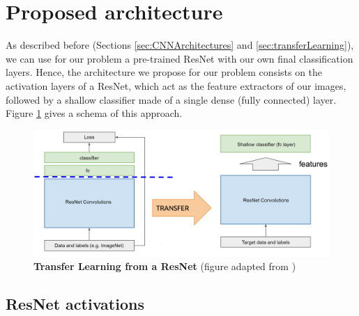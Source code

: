 

\section{Proposed architecture}\label{sec:dl_architecture}

As described before (Sections \ref{sec:CNNArchitectures} and \ref{sec:transferLearning}), we can use for our problem a pre-trained ResNet with our own final classification layers. Hence, the architecture we propose for our problem consists on the activation layers of a ResNet, which act as the feature extractors of our images, followed by a shallow classifier made of a single dense (fully connected) layer. Figure \ref{fig:transfer_learning} gives a schema of this approach.

\begin{figure}[h!]
	\centering
	\captionsetup{width=1\linewidth}
	\includegraphics[width=1\textwidth]{Figures/transfer_learning.png}
	\caption{\textbf{Transfer Learning from a ResNet} (figure adapted from \parencite{McGuinness2017})}
	\label{fig:transfer_learning}
\end{figure}

\subsection{ResNet activations}

